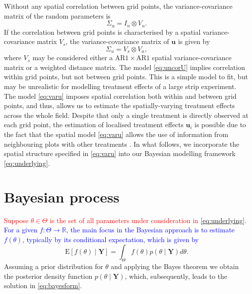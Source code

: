 \documentclass[a4paper]{article}   	%
\newcommand{\E}{\mathrm{E}}
\newcommand{\N}{\mathcal{N}}
\newcommand{\AR}{\mathrm{AR}1}
\begin{document}
	
	Without any spatial correlation between grid points, the variance-covariance matrix of the random parameters is
	\begin{equation}\label{eq:uncorU}
		\Sigma_u = I_n \otimes V_u.
	\end{equation}
	If the correlation between grid points is characterised by a spatial variance-covariance matrix $V_s$, the variance-covariance matrix of $\bm{u}$ is given by
	\begin{equation}\label{eq:varu}
		\Sigma_u = V_s \otimes V_u,
	\end{equation}
	where $V_s$ may be considered either a $\AR\times \AR$ spatial variance-covariance  matrix or a weighted distance matrix.
	The model \eqref{eq:uncorU} implies correlation within grid points, but not between grid points. This is a simple model to fit, but may be unrealistic for modelling treatment effects of a large strip experiment. The model \eqref{eq:varu} imposes spatial correlation both within and between grid points, and thus, allows us to estimate the spatially-varying treatment effects across the whole field. Despite that only a single treatment is directly observed at each grid point, the estimation of localised treatment effects $\bm{u}_i$ is possible due to the fact that the spatial model \eqref{eq:varu} allows the use of information from neighbouring plots with other treatments \parencite{Piepho2011Statistical}. In what follows, we incorporate the spatial structure specified in \eqref{eq:varu} into our Bayesian modelling framework \eqref{eq:underlying}. 
	
	
	\section{Bayesian process}\label{sec:bayes}
	\textcolor{red}{Suppose $\theta \in \Theta$ is the set of all parameters under consideration in \eqref{eq:underlying}.} \textcolor{blue}{For a given $f:\Theta \rightarrow \mathbb{R}$, the main focus in the Bayesian approach is to estimate $f(\theta)$, typically by its conditional expectation, which is given by }
	\begin{equation}\label{eq:bayesform}
		\E[f(\theta)\mid \bm{Y}] = \int_{\Theta} f(\theta)p(\theta\mid \bm{Y})d\theta.
	\end{equation}
	 Assuming a prior distribution for $\theta$ and applying the Bayes theorem we obtain the posterior density function $p(\theta\mid \bm{Y})$, which, subsequently, leads to the solution in \eqref{eq:bayesform}. 
	
\end{document}
